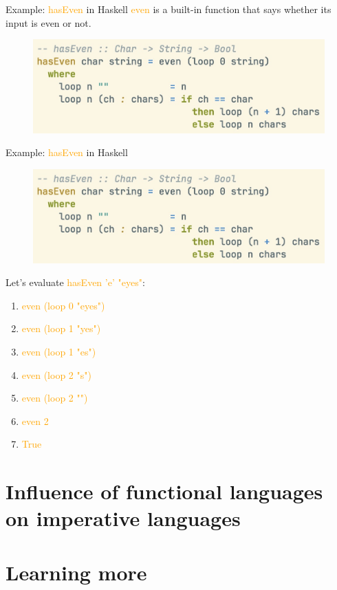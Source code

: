 \documentclass[pdf]{beamer}
\newcommand{\code}[1]{\textcolor{Orange}{\textsf{#1}}}
\begin{document}
\begin{frame}{Example: \code{hasEven} in Haskell}
  \code{even} is a built-in function that says whether its input is even or not.
    \begin{figure}[H]
    \centering
    \includegraphics[width=\linewidth]{hasEven-hs}
  \end{figure}
\end{frame}

\begin{frame}{Example: \code{hasEven} in Haskell}
    \begin{figure}[H]
    \centering
    \includegraphics[width=0.80\linewidth]{hasEven-hs}
  \end{figure}

  \pause
  Let's evaluate \code{hasEven 'e' "eyes"}:

  \begin{enumerate}
    \item<1-> \code{even (loop 0 "eyes")}
    \item<2-> \code{even (loop 1 "yes")}
    \item<3-> \code{even (loop 1 "es")}
    \item<4-> \code{even (loop 2 "s")}
    \item<5-> \code{even (loop 2 "")}
    \item<6-> \code{even 2}
    \item<7-> \code{True}
  \end{enumerate}

\end{frame}

\section{Influence of functional languages on imperative languages}
\label{sec:influence}

\section{Learning more}
\label{sec:learning-more}
\end{document}
